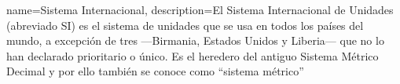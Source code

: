 
{
name={Sistema Internacional},
description={El Sistema Internacional de Unidades (abreviado SI) es el sistema de unidades que se usa en todos los países del mundo, a excepción de tres —Birmania, Estados Unidos y Liberia— que no lo han declarado prioritario o único. Es el heredero del antiguo Sistema Métrico Decimal y por ello también se conoce como ``sistema métrico''}
}